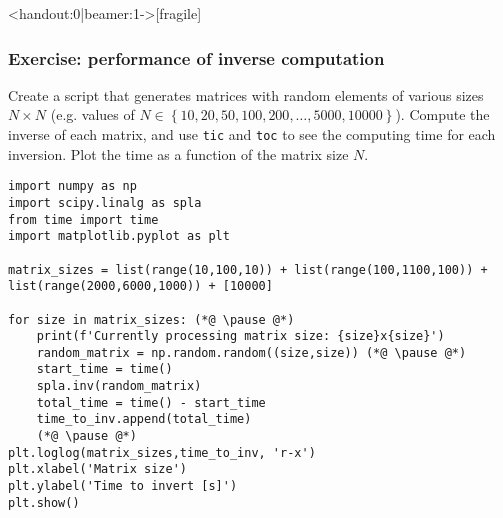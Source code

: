 
{\nologo
\begin{frame}<handout:0|beamer:1->[fragile]
  \frametitle{Exercise: performance of inverse computation}
  Create a script that generates matrices with random elements of various sizes $N\times N$ (e.g. values of $N\in\left\{10,20,50,100,200,\ldots,5000,10000\right\}$). Compute the inverse of each matrix, and use \lstinline$tic$ and \lstinline$toc$ to see the computing time for each inversion. Plot the time as a function of the matrix size $N$. \pause
    \begin{lstlisting}
import numpy as np
import scipy.linalg as spla
from time import time
import matplotlib.pyplot as plt

matrix_sizes = list(range(10,100,10)) + list(range(100,1100,100)) + list(range(2000,6000,1000)) + [10000]

for size in matrix_sizes: (*@ \pause @*)
    print(f'Currently processing matrix size: {size}x{size}')
    random_matrix = np.random.random((size,size)) (*@ \pause @*)
    start_time = time()
    spla.inv(random_matrix)
    total_time = time() - start_time
    time_to_inv.append(total_time)
    (*@ \pause @*)
plt.loglog(matrix_sizes,time_to_inv, 'r-x')
plt.xlabel('Matrix size')
plt.ylabel('Time to invert [s]')
plt.show()
  \end{lstlisting}
\end{frame}
}


